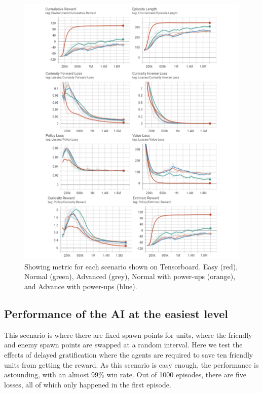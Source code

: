 \documentclass[conference]{IEEEtran}
\begin{document}
\begin{figure}[ht]
\centerline{\includegraphics[width=1\textwidth]{assets/all_runs_final}}
\caption{Showing metric for each scenario shown on Tensorboard. Easy (red), Normal (green), Advanced (grey), Normal with power-ups (orange), and Advance with power-ups (blue).}
\label{all_runs_final}
\end{figure}

\subsection{Performance of the AI at the easiest level}

This scenario is where there are fixed spawn points for units, where the friendly and enemy spawn points are swapped at a random interval. Here we test the effects of delayed gratification where the agents are required to save ten friendly units from getting the reward. As this scenario is easy enough, the performance is astounding, with an almost 99\% win rate. Out of 1000 episodes, there are five losses, all of which only happened in the first episode. 
\end{document}
